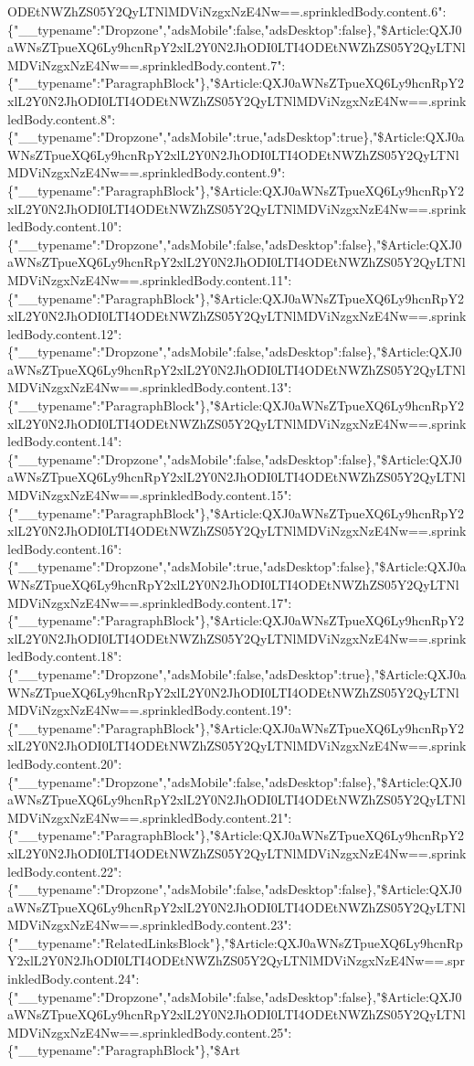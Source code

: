 ODEtNWZhZS05Y2QyLTNlMDViNzgxNzE4Nw==.sprinkledBody.content.6":\{"\_\_typename":"Dropzone","adsMobile":false,"adsDesktop":false\},"\$Article:QXJ0aWNsZTpueXQ6Ly9hcnRpY2xlL2Y0N2JhODI0LTI4ODEtNWZhZS05Y2QyLTNlMDViNzgxNzE4Nw==.sprinkledBody.content.7":\{"\_\_typename":"ParagraphBlock"\},"\$Article:QXJ0aWNsZTpueXQ6Ly9hcnRpY2xlL2Y0N2JhODI0LTI4ODEtNWZhZS05Y2QyLTNlMDViNzgxNzE4Nw==.sprinkledBody.content.8":\{"\_\_typename":"Dropzone","adsMobile":true,"adsDesktop":true\},"\$Article:QXJ0aWNsZTpueXQ6Ly9hcnRpY2xlL2Y0N2JhODI0LTI4ODEtNWZhZS05Y2QyLTNlMDViNzgxNzE4Nw==.sprinkledBody.content.9":\{"\_\_typename":"ParagraphBlock"\},"\$Article:QXJ0aWNsZTpueXQ6Ly9hcnRpY2xlL2Y0N2JhODI0LTI4ODEtNWZhZS05Y2QyLTNlMDViNzgxNzE4Nw==.sprinkledBody.content.10":\{"\_\_typename":"Dropzone","adsMobile":false,"adsDesktop":false\},"\$Article:QXJ0aWNsZTpueXQ6Ly9hcnRpY2xlL2Y0N2JhODI0LTI4ODEtNWZhZS05Y2QyLTNlMDViNzgxNzE4Nw==.sprinkledBody.content.11":\{"\_\_typename":"ParagraphBlock"\},"\$Article:QXJ0aWNsZTpueXQ6Ly9hcnRpY2xlL2Y0N2JhODI0LTI4ODEtNWZhZS05Y2QyLTNlMDViNzgxNzE4Nw==.sprinkledBody.content.12":\{"\_\_typename":"Dropzone","adsMobile":false,"adsDesktop":false\},"\$Article:QXJ0aWNsZTpueXQ6Ly9hcnRpY2xlL2Y0N2JhODI0LTI4ODEtNWZhZS05Y2QyLTNlMDViNzgxNzE4Nw==.sprinkledBody.content.13":\{"\_\_typename":"ParagraphBlock"\},"\$Article:QXJ0aWNsZTpueXQ6Ly9hcnRpY2xlL2Y0N2JhODI0LTI4ODEtNWZhZS05Y2QyLTNlMDViNzgxNzE4Nw==.sprinkledBody.content.14":\{"\_\_typename":"Dropzone","adsMobile":false,"adsDesktop":false\},"\$Article:QXJ0aWNsZTpueXQ6Ly9hcnRpY2xlL2Y0N2JhODI0LTI4ODEtNWZhZS05Y2QyLTNlMDViNzgxNzE4Nw==.sprinkledBody.content.15":\{"\_\_typename":"ParagraphBlock"\},"\$Article:QXJ0aWNsZTpueXQ6Ly9hcnRpY2xlL2Y0N2JhODI0LTI4ODEtNWZhZS05Y2QyLTNlMDViNzgxNzE4Nw==.sprinkledBody.content.16":\{"\_\_typename":"Dropzone","adsMobile":true,"adsDesktop":false\},"\$Article:QXJ0aWNsZTpueXQ6Ly9hcnRpY2xlL2Y0N2JhODI0LTI4ODEtNWZhZS05Y2QyLTNlMDViNzgxNzE4Nw==.sprinkledBody.content.17":\{"\_\_typename":"ParagraphBlock"\},"\$Article:QXJ0aWNsZTpueXQ6Ly9hcnRpY2xlL2Y0N2JhODI0LTI4ODEtNWZhZS05Y2QyLTNlMDViNzgxNzE4Nw==.sprinkledBody.content.18":\{"\_\_typename":"Dropzone","adsMobile":false,"adsDesktop":true\},"\$Article:QXJ0aWNsZTpueXQ6Ly9hcnRpY2xlL2Y0N2JhODI0LTI4ODEtNWZhZS05Y2QyLTNlMDViNzgxNzE4Nw==.sprinkledBody.content.19":\{"\_\_typename":"ParagraphBlock"\},"\$Article:QXJ0aWNsZTpueXQ6Ly9hcnRpY2xlL2Y0N2JhODI0LTI4ODEtNWZhZS05Y2QyLTNlMDViNzgxNzE4Nw==.sprinkledBody.content.20":\{"\_\_typename":"Dropzone","adsMobile":false,"adsDesktop":false\},"\$Article:QXJ0aWNsZTpueXQ6Ly9hcnRpY2xlL2Y0N2JhODI0LTI4ODEtNWZhZS05Y2QyLTNlMDViNzgxNzE4Nw==.sprinkledBody.content.21":\{"\_\_typename":"ParagraphBlock"\},"\$Article:QXJ0aWNsZTpueXQ6Ly9hcnRpY2xlL2Y0N2JhODI0LTI4ODEtNWZhZS05Y2QyLTNlMDViNzgxNzE4Nw==.sprinkledBody.content.22":\{"\_\_typename":"Dropzone","adsMobile":false,"adsDesktop":false\},"\$Article:QXJ0aWNsZTpueXQ6Ly9hcnRpY2xlL2Y0N2JhODI0LTI4ODEtNWZhZS05Y2QyLTNlMDViNzgxNzE4Nw==.sprinkledBody.content.23":\{"\_\_typename":"RelatedLinksBlock"\},"\$Article:QXJ0aWNsZTpueXQ6Ly9hcnRpY2xlL2Y0N2JhODI0LTI4ODEtNWZhZS05Y2QyLTNlMDViNzgxNzE4Nw==.sprinkledBody.content.24":\{"\_\_typename":"Dropzone","adsMobile":false,"adsDesktop":false\},"\$Article:QXJ0aWNsZTpueXQ6Ly9hcnRpY2xlL2Y0N2JhODI0LTI4ODEtNWZhZS05Y2QyLTNlMDViNzgxNzE4Nw==.sprinkledBody.content.25":\{"\_\_typename":"ParagraphBlock"\},"\$Art